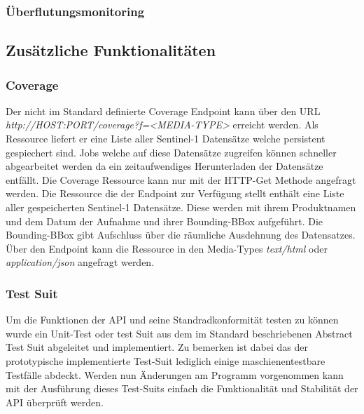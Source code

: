 \subsubsection{Überflutungsmonitoring}
\subsection{Zusätzliche Funktionalitäten}
\subsubsection{Coverage} 
Der nicht im Standard definierte Coverage Endpoint kann über den URL \textit{http://HOST:PORT/coverage?f=<MEDIA-TYPE>} erreicht werden. Als Ressource liefert er eine Liste aller Sentinel-1 Datensätze welche persistent gespiechert sind. 
Jobs welche auf diese Datensätze zugreifen können schneller abgearbeitet werden da ein zeitaufwendiges Herunterladen der Datensätze entfällt. Die Coverage Ressource kann nur mit der HTTP-Get Methode angefragt werden. 
Die Ressource die der Endpoint zur Verfügung stellt enthält eine Liste aller gespeicherten Sentinel-1 Datensätze. Diese werden mit ihrem Produktnamen und dem Datum der Aufnahme 
und ihrer Bounding-BBox aufgeführt. Die Bounding-BBox gibt Aufschluss über die räumliche Ausdehnung des Datensatzes. 
Über den Endpoint kann die Ressource in den Media-Types \textit{text/html} oder \textit{application/json} angefragt werden. 

\subsubsection{Test Suit}
Um die Funktionen der API und seine Standradkonformität testen zu können wurde ein Unit-Test oder test Suit aus dem im Standard beschriebenen Abstract Test Suit abgeleitet und 
implementiert. Zu bemerken ist dabei das der prototypische implementierte Test-Suit lediglich einige maschienentestbare Testfälle abdeckt. 
Werden nun Änderungen am Programm vorgenommen kann mit der Ausführung dieses Test-Suits einfach die Funktionalität und Stabilität der API überprüft werden. 